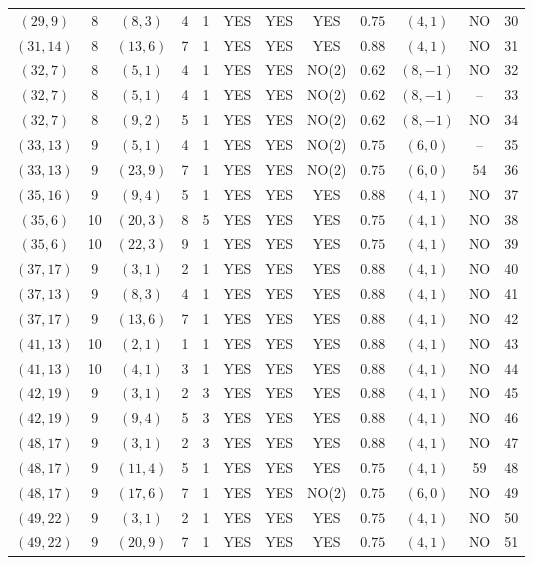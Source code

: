 \begin{longtable}{|c|c|c|c|c|c|c|c|c|c|c|c|}
$(29,9)$ & 8 & $(8,3)$ & 4 & 1 & YES & YES & YES & $0.75$ & $(4,1)$ & NO & 30\\
$(31,14)$ & 8 & $(13,6)$ & 7 & 1 & YES & YES & YES & $0.88$ & $(4,1)$ & NO & 31\\
$(32,7)$ & 8 & $(5,1)$ & 4 & 1 & YES & YES & NO(2) & $0.62$ & $(8,-1)$ & NO & 32\\
$(32,7)$ & 8 & $(5,1)$ & 4 & 1 & YES & YES & NO(2) & $0.62$ & $(8,-1)$ & -- & 33\\
$(32,7)$ & 8 & $(9,2)$ & 5 & 1 & YES & YES & NO(2) & $0.62$ & $(8,-1)$ & NO & 34\\
$(33,13)$ & 9 & $(5,1)$ & 4 & 1 & YES & YES & NO(2) & $0.75$ & $(6,0)$ & -- & 35\\
$(33,13)$ & 9 & $(23,9)$ & 7 & 1 & YES & YES & NO(2) & $0.75$ & $(6,0)$ & 54 & 36\\
$(35,16)$ & 9 & $(9,4)$ & 5 & 1 & YES & YES & YES & $0.88$ & $(4,1)$ & NO & 37\\
$(35,6)$ & 10 & $(20,3)$ & 8 & 5 & YES & YES & YES & $0.75$ & $(4,1)$ & NO & 38\\
$(35,6)$ & 10 & $(22,3)$ & 9 & 1 & YES & YES & YES & $0.75$ & $(4,1)$ & NO & 39\\
$(37,17)$ & 9 & $(3,1)$ & 2 & 1 & YES & YES & YES & $0.88$ & $(4,1)$ & NO & 40\\
$(37,13)$ & 9 & $(8,3)$ & 4 & 1 & YES & YES & YES & $0.88$ & $(4,1)$ & NO & 41\\
$(37,17)$ & 9 & $(13,6)$ & 7 & 1 & YES & YES & YES & $0.88$ & $(4,1)$ & NO & 42\\
$(41,13)$ & 10 & $(2,1)$ & 1 & 1 & YES & YES & YES & $0.88$ & $(4,1)$ & NO & 43\\
$(41,13)$ & 10 & $(4,1)$ & 3 & 1 & YES & YES & YES & $0.88$ & $(4,1)$ & NO & 44\\
$(42,19)$ & 9 & $(3,1)$ & 2 & 3 & YES & YES & YES & $0.88$ & $(4,1)$ & NO & 45\\
$(42,19)$ & 9 & $(9,4)$ & 5 & 3 & YES & YES & YES & $0.88$ & $(4,1)$ & NO & 46\\
$(48,17)$ & 9 & $(3,1)$ & 2 & 3 & YES & YES & YES & $0.88$ & $(4,1)$ & NO & 47\\
$(48,17)$ & 9 & $(11,4)$ & 5 & 1 & YES & YES & YES & $0.75$ & $(4,1)$ & 59 & 48\\
$(48,17)$ & 9 & $(17,6)$ & 7 & 1 & YES & YES & NO(2) & $0.75$ & $(6,0)$ & NO & 49\\
$(49,22)$ & 9 & $(3,1)$ & 2 & 1 & YES & YES & YES & $0.75$ & $(4,1)$ & NO & 50\\
$(49,22)$ & 9 & $(20,9)$ & 7 & 1 & YES & YES & YES & $0.75$ & $(4,1)$ & NO & 51\\

\end{longtable}
